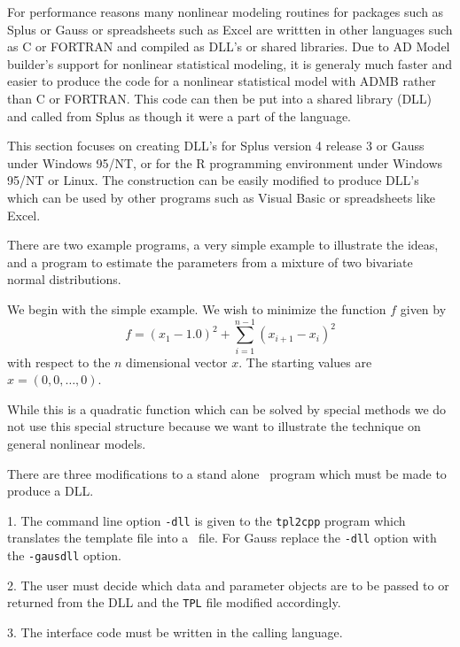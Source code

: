 %
%

For performance reasons many nonlinear modeling routines for packages
such as Splus or Gauss or spreadsheets such as Excel
are writtten in other languages such as C or FORTRAN and
compiled as DLL's or shared libraries. Due to 
AD Model builder's support for nonlinear statistical modeling, it
is generaly much faster and easier to produce the code for
a nonlinear statistical model with ADMB rather than C or FORTRAN.
This code can then be put into a shared library (DLL) and called
from Splus as though it were a part of the language. 

This section focuses on creating DLL's for Splus version 4 release 3 or Gauss
under
Windows 95/NT,
or for the R programming environment under Windows 95/NT or Linux. 
The construction can be easily modified to produce DLL's which can be
used by other programs such as Visual Basic or spreadsheets like Excel.

There are two example programs, a very 
simple example to illustrate the ideas,
and a program to estimate the parameters from a mixture of two bivariate
normal distributions.
 
We begin with the simple example. We
wish to minimize the function $f$ given by
$$ f=(x_1-1.0)^2+\sum_{i=1}^{n-1}(x_{i+1}-x_i)^2$$
with respect to the $n$ dimensional vector $x$. The
starting values are $x=(0,0,\ldots,0)$.
   
While this is a quadratic function which can be solved by special methods
we do not use this special structure because we want to illustrate
the technique on general nonlinear models. 

There are three modifications to a stand alone \ADM\ program
which must be made to produce a DLL.

\begin{description}
\item{1.} The command line option {\tt -dll} is given to the
{\tt tpl2cpp} program which translates the template file into a
\cplus\ file. For Gauss replace the {\tt -dll} option with
the {\tt -gausdll} option.

\item{2.} The user must decide which data and parameter
objects are to be passed to or returned from the DLL
and the {\tt TPL} file modified accordingly.

\item{3.} The interface code must be written in the
calling language. 
\end{description}

